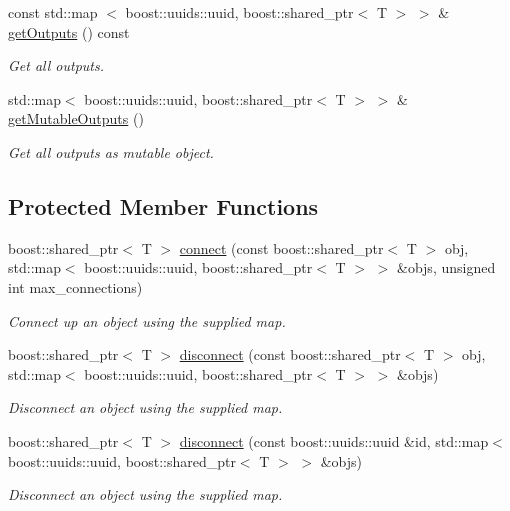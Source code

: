 \begin{DoxyCompactItemize}
const std\-::map\*
$<$ boost\-::uuids\-::uuid, \*
boost\-::shared\-\_\-ptr$<$ \-T $>$ $>$ \& \hyperlink{classcryomesh_1_1common_1_1Connector_af108b3bdc8adee1d2f6ce34c6b7781e6}{get\-Outputs} () const 
\begin{DoxyCompactList}\small\item\em \-Get all outputs. \end{DoxyCompactList}\item 
std\-::map$<$ boost\-::uuids\-::uuid, \*
boost\-::shared\-\_\-ptr$<$ \-T $>$ $>$ \& \hyperlink{classcryomesh_1_1common_1_1Connector_a974b1c610f3c949d64560f2d0d44f5eb}{get\-Mutable\-Outputs} ()
\begin{DoxyCompactList}\small\item\em \-Get all outputs as mutable object. \end{DoxyCompactList}\end{DoxyCompactItemize}
\subsection*{\-Protected \-Member \-Functions}
\begin{DoxyCompactItemize}
\item 
boost\-::shared\-\_\-ptr$<$ \-T $>$ \hyperlink{classcryomesh_1_1common_1_1Connector_a1adff096f822eee244c7c26cd7f3fc3f}{connect} (const boost\-::shared\-\_\-ptr$<$ \-T $>$ obj, std\-::map$<$ boost\-::uuids\-::uuid, boost\-::shared\-\_\-ptr$<$ \-T $>$ $>$ \&objs, unsigned int max\-\_\-connections)
\begin{DoxyCompactList}\small\item\em \-Connect up an object using the supplied map. \end{DoxyCompactList}\item 
boost\-::shared\-\_\-ptr$<$ \-T $>$ \hyperlink{classcryomesh_1_1common_1_1Connector_abdabb88b660f2f71a25a15f81fe5b683}{disconnect} (const boost\-::shared\-\_\-ptr$<$ \-T $>$ obj, std\-::map$<$ boost\-::uuids\-::uuid, boost\-::shared\-\_\-ptr$<$ \-T $>$ $>$ \&objs)
\begin{DoxyCompactList}\small\item\em \-Disconnect an object using the supplied map. \end{DoxyCompactList}\item 
boost\-::shared\-\_\-ptr$<$ \-T $>$ \hyperlink{classcryomesh_1_1common_1_1Connector_a3ddc25ebd1129d2d5d93126f768fd1ee}{disconnect} (const boost\-::uuids\-::uuid \&id, std\-::map$<$ boost\-::uuids\-::uuid, boost\-::shared\-\_\-ptr$<$ \-T $>$ $>$ \&objs)
\begin{DoxyCompactList}\small\item\em \-Disconnect an object using the supplied map. \end{DoxyCompactList}\end{DoxyCompactItemize}

